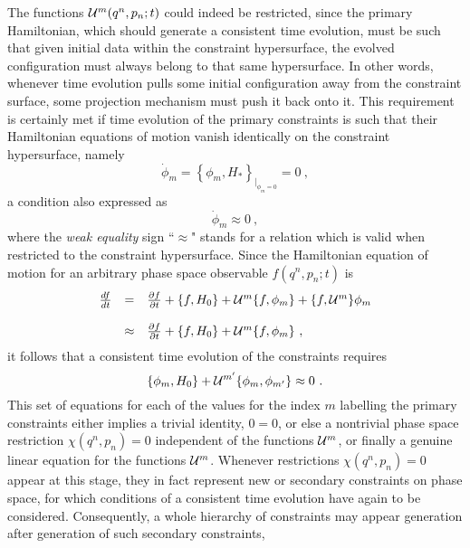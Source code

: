 \documentclass[a4paper,11pt]{article}
\begin{document}
The functions ${\cal U}^m(q^n,p_n;t)$ could indeed be restricted, since
the primary Hamiltonian, which should generate a consistent time evolution,
must be such that given initial data within the constraint hypersurface, the
evolved con\-fi\-gu\-ra\-tion must always belong to that same hypersurface. 
In other words, whenever time evolution pulls some initial configuration away 
from the constraint surface, some projection mechanism must push it back onto 
it. This requirement is certainly met if time evolution of the primary 
constraints is such that their Hamiltonian equations of motion vanish
identically on the constraint hypersurface, namely
\begin{equation}
\dot{\phi}_m=\left\{\phi_m,H_*\right\}_{|_{\phi_m=0}}=0\ ,
\end{equation}
a condition also expressed as
\begin{equation}
\dot{\phi}_m\approx 0\ ,
\end{equation}
where the {\sl weak equality\/} sign ``$\approx$" stands for a relation
which is valid when restricted to the constraint hypersurface. Since the
Hamiltonian equation of motion for an arbitrary phase space observable
$f(q^n,p_n;t)$ is
\begin{equation}
\begin{array}{r c l}
\frac{df}{dt}&=&\frac{\partial f}{\partial t}+
\{f,H_0\}+{\cal U}^m\{f,\phi_m\}+\{f,{\cal U}^m\}\phi_m\\
 & & \\
&\approx&\frac{\partial f}{\partial t}+\{f,H_0\}+{\cal U}^m\{f,\phi_m\}\ ,
\end{array}
\end{equation}
it follows that a consistent time evolution of the constraints requires
\begin{equation}
\{\phi_m,H_0\}+{\cal U}^{m'}\{\phi_m,\phi_{m'}\}\approx 0\ .
\end{equation}
This set of equations for each of the values for the index $m$ labelling the
primary constraints either implies a trivial identity, $0=0$, or else
a nontrivial phase space restriction $\chi(q^n,p_n)=0$ independent of
the functions ${\cal U}^m$, or finally a genuine linear equation for
the functions ${\cal U}^m$. Whenever restrictions $\chi(q^n,p_n)=0$
appear at this stage, they in fact represent new or secondary constraints
on phase space, for which conditions of a consistent time evolution
have again to be considered. Consequently, a whole hierarchy of constraints
may appear generation after generation of such secondary constraints, 
\end{document}
